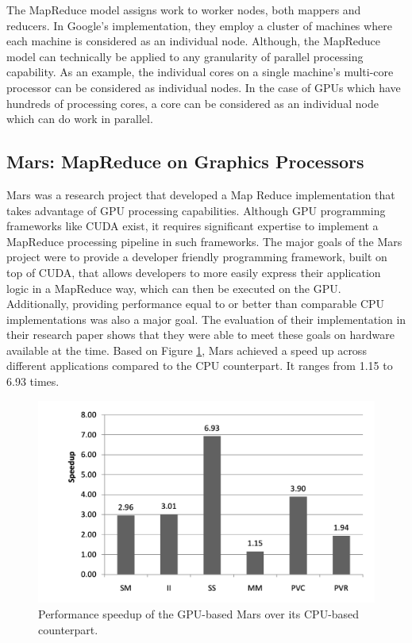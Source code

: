 \documentclass{article}
\begin{document}
The MapReduce model assigns work to worker nodes, both mappers and reducers. In Google's implementation, they employ a cluster of machines where each machine is considered as an individual node. Although, the MapReduce model can technically be applied to any granularity of parallel processing capability. As an example, the individual cores on a single machine's multi-core processor can be considered as individual nodes. In the case of GPUs which have hundreds of processing cores, a core can be considered as an individual node which can do work in parallel. 

\subsection{Mars: MapReduce on Graphics Processors}
Mars was a research project that developed a Map Reduce implementation that takes advantage of GPU processing capabilities. Although GPU programming frameworks like CUDA \cite{cuda_docs} exist, it requires significant expertise to implement a MapReduce processing pipeline in such frameworks. The major goals of the Mars project were to provide a developer friendly programming framework, built on top of CUDA, that allows developers to more easily express their application logic in a MapReduce way, which can then be executed on the GPU. Additionally, providing performance equal to or better than comparable CPU implementations was also a major goal. The evaluation of their implementation in their research paper shows that they were able to meet these goals on hardware available at the time. Based on Figure \ref{fig:speedup}, Mars achieved a speed up across different applications compared to the CPU counterpart. It ranges from 1.15 to 6.93 times.

\begin{figure}
    \centering
    \includegraphics[width=0.9\linewidth]{images/speedup.png}
    \caption{Performance speedup of the GPU-based Mars over
its CPU-based counterpart.\cite{mars}}
    \label{fig:speedup}
\end{figure}
\end{document}

